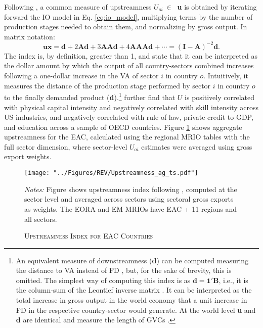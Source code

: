 \documentclass[a4paper]{article}
\begin{document}
Following \citet{antras2012measuring, antras2022global}, a common measure of upstreamness $U_{oi} \ \in \ $ \textbf{u} is obtained by iterating forward the IO model in Eq. \ref{eq:io_model}, multiplying terms by the number of production stages needed to obtain them, and normalizing by gross output. In matrix notation: 
%
\begin{equation} \label{eq:upstreamness}
\textbf{u}\textbf{x} = \textbf{d} + 2\textbf{Ad} + 3\textbf{AAd} + 4\textbf{AAAd} + \cdots = (\textbf{I}-\textbf{A})^{-2}\textbf{d}.
\end{equation}
%
The index is, by definition, greater than 1, and \citet{antras2012measuring} state that it can be interpreted as the dollar amount by which the output of all country-sectors combined increases following a one-dollar increase in the VA of sector $i$ in country $o$. Intuitively, it measures the distance of the production stage performed by sector $i$ in country $o$ to the finally demanded product (\textbf{d}).\footnote{\label{fn:ds} An equivalent measure of downstreamness (\textbf{d}) can be computed measuring the distance to VA instead of FD \citep{antras2022global, miller2017output, mancini2023positioning}, but, for the sake of brevity, this is omitted. The simplest way of computing this index is as $\textbf{d}=\textbf{1}'\textbf{B}$, i.e., it is the column-sum of the Leontief inverse matrix \citep{miller2017output, antras2022global}. It can be interpreted as the total increase in gross output in the world economy that a unit increase in FD in the respective country-sector would generate. At the world level \textbf{u} and \textbf{d} are identical and measure the length of GVCs \citep{mancini2023positioning}.} \citet{antras2012measuring} further find that $U$ is positively correlated with physical capital intensity and negatively correlated with skill intensity across US industries, and negatively correlated with rule of law, private credit to GDP, and education across a sample of OECD countries. Figure \ref{fig:EACUS_ag_ts} shows aggregate upstreamness for the EAC, calculated using the regional MRIO tables with the full sector dimension, where sector-level $U_{oi}$ estimates were averaged using gross export weights. 

\begin{figure}[h!]
\centering
\caption{\label{fig:EACUS_ag_ts}\textsc{Upstreamness Index for EAC Countries}}
\texttt{[image: "../Figures/REV/Upstreamness\_ag\_ts.pdf"]} \\ \raggedright
\scriptsize
\emph{Notes:} Figure shows upstreamness index following \citet{antras2012measuring}, computed at the sector level and averaged across sectors using sectoral gross exports as weights. The EORA and EM MRIOs have EAC + 11 regions and all sectors.  
\end{figure}
\FloatBarrier
\end{document}
